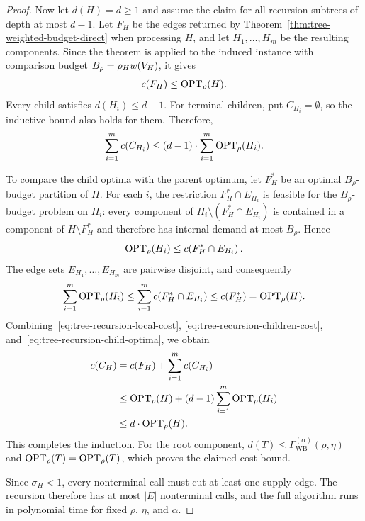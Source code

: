 \begin{proof}
    Now let $d(H)=d\geq1$ and assume the claim for all recursion subtrees of depth at most $d-1$. Let $F_H$ be the edges returned by Theorem~\ref{thm:tree-weighted-budget-direct} when processing $H$, and let $H_1,\ldots,H_m$ be the resulting components. Since the theorem is applied to the induced instance with comparison budget $B_\rho=\rho_H w\mathopen{}\left( V_H \right)$, it gives
    \begin{equation}\label{eq:tree-recursion-local-cost}
        c\mathopen{}\left( F_H \right)\leq\textup{OPT}_{\rho}(H).
    \end{equation}
    Every child satisfies $d(H_i)\leq d-1$.     For terminal children, put $C_{H_i}=\emptyset$, so the inductive bound also holds for them. Therefore,
    \begin{equation}\label{eq:tree-recursion-children-cost}
        \sum_{i=1}^{m}c\mathopen{}\left( C_{H_i} \right)
        \leq(d-1)\cdot \sum_{i=1}^{m}\textup{OPT}_{\rho}(H_i).
    \end{equation}

    To compare the child optima with the parent optimum, let $F_H^*$ be an optimal $B_\rho$-budget partition of $H$. For each $i$, the restriction $F_H^*\cap E_{H_i}$ is feasible for the $B_\rho$-budget problem on $H_i$: every component of $H_i\setminus(F_H^*\cap E_{H_i})$ is contained in a component of $H\setminus F_H^*$ and therefore has internal demand at most $B_\rho$. Hence
    \[
        \textup{OPT}_{\rho}(H_i)\leq c\mathopen{}\left( F_H^*\cap E_{H_i} \right).
    \]
    The edge sets $E_{H_1},\ldots,E_{H_m}$ are pairwise disjoint, and consequently
    \begin{equation}\label{eq:tree-recursion-child-optima}
        \sum_{i=1}^{m}\textup{OPT}_{\rho}(H_i)
        \leq\sum_{i=1}^{m}c\mathopen{}\left( F_H^*\cap E_{H_i} \right)
        \leq c\mathopen{}\left( F_H^* \right)
        =\textup{OPT}_{\rho}(H).
    \end{equation}
    Combining~\eqref{eq:tree-recursion-local-cost}, \eqref{eq:tree-recursion-children-cost}, and~\eqref{eq:tree-recursion-child-optima}, we obtain
    \begin{align*}
        c\mathopen{}\left( C_H \right)
        &=c\mathopen{}\left( F_H \right)+\sum_{i=1}^{m}c\mathopen{}\left( C_{H_i} \right)\\
        &\leq\textup{OPT}_{\rho}(H)+(d-1)\sum_{i=1}^{m}\textup{OPT}_{\rho}(H_i)\\
        &\leq d\cdot\textup{OPT}_{\rho}(H).
    \end{align*}
    This completes the induction. For the root component, $d(T)\leq\Gamma_{\mathrm{WB}}^{(\alpha)}(\rho,\eta)$ and $\textup{OPT}_{\rho}(T)=\textup{OPT}_{\rho}\mathopen{}\left( T \right)$, which proves the claimed cost bound.

    Since $\sigma_H<1$, every nonterminal call must cut at least one supply edge. The recursion therefore has at most $|E|$ nonterminal calls, and the full algorithm runs in polynomial time for fixed $\rho$, $\eta$, and $\alpha$.
\end{proof}
\fi

